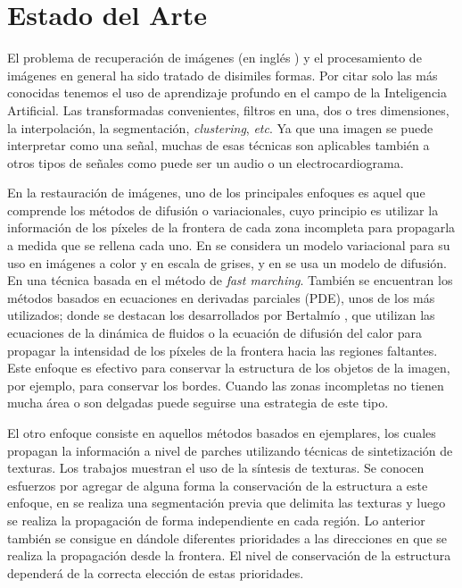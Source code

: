 \section*{Estado del Arte}

El problema de recuperaci\'on de im\'agenes (en ingl\'es \II) y el procesamiento de imágenes en general ha sido tratado de disimiles formas. Por citar solo las m\'as conocidas tenemos el uso de aprendizaje profundo en el campo de la Inteligencia Artificial. Las transformadas convenientes, filtros en una, dos o tres dimensiones, la interpolaci\'on, la segmentaci\'on, \textit{clustering}, \textit{etc}. Ya que una imagen se puede interpretar como una señal, muchas de esas t\'ecnicas son aplicables tambi\'en a otros tipos de señales como puede ser un audio o un electrocardiograma.

En la restauraci\'on de im\'agenes, uno de los principales enfoques es aquel que comprende los m\'etodos de difusión o variacionales, cuyo principio es utilizar la informaci\'on de los p\'ixeles de la frontera de cada zona incompleta para propagarla a medida que se rellena cada uno. En \cite{ballester2001variational} se considera un modelo variacional para su uso en im\'agenes a color y en escala de grises, y en \cite{chan2001nontexture} se usa un modelo de difusión. En \cite{telea2004image} una t\'ecnica basada en el m\'etodo de \textit{fast marching}. También se encuentran los métodos basados en ecuaciones en derivadas parciales (PDE), unos de los m\'as utilizados; donde se destacan los desarrollados por Bertalmío \cite{bertalmio2001navier,bertalmio2000image}, que utilizan las ecuaciones de la dinámica de fluidos o la ecuación de difusión del calor para propagar la intensidad de los píxeles de la frontera hacia las regiones faltantes. Este enfoque es efectivo para conservar la estructura de los objetos de la imagen, por ejemplo, para conservar los bordes. Cuando las zonas incompletas no tienen mucha área o son delgadas puede seguirse una estrategia de este tipo.

El otro enfoque consiste en aquellos m\'etodos basados en ejemplares, los cuales propagan la informaci\'on a nivel de parches utilizando t\'ecnicas de sintetizaci\'on de texturas. Los trabajos \cite{ashikhmin2001synthesizing,garber1981computational,liang2001real} muestran el uso de la s\'intesis de texturas. Se conocen esfuerzos por agregar de alguna forma la conservaci\'on de la estructura a este enfoque, en \cite{li2014image} se realiza una segmentaci\'on previa que delimita las texturas y luego se realiza la propagaci\'on de forma independiente en cada regi\'on. Lo anterior tambi\'en se consigue en \cite{criminisi2003object, wang2011image} d\'andole diferentes prioridades a las direcciones en que se realiza la propagaci\'on desde la frontera. El nivel de conservaci\'on de la estructura depender\'a de la correcta elecci\'on de estas prioridades.

